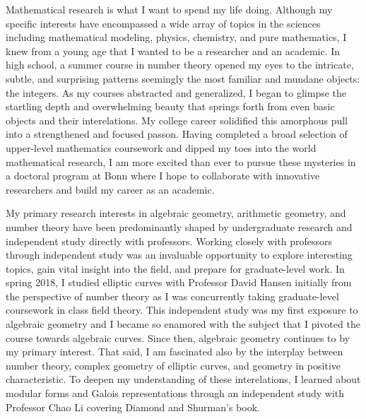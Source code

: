 \documentclass[11pt]{amsart}
\begin{document}
Mathematical research is what I want to spend my life doing. Although my specific interests have encompassed a wide array of topics in the sciences including mathematical modeling, physics, chemistry, and pure mathematics, I knew from a young age that I wanted to be a researcher and an academic. In high school, a summer course in number theory opened my eyes to the intricate, subtle, and surprising patterns seemingly the most familiar and mundane objects: the integers. As my courses abstracted and generalized, I began to glimpse the startling depth and overwhelming beauty that springs forth from even basic objects and their interelations. My college career solidified this amorphous pull into a strengthened and focused passon. Having completed a broad selection of upper-level mathematics coursework and dipped my toes into the world mathematical research, I am more excited than ever to pursue these mysteries in a doctoral program at Bonn where I hope to collaborate with innovative researchers and build my career as an academic.
\par
My primary research interests in algebraic geometry, arithmetic geometry, and number theory have been predominantly shaped by undergraduate research and independent study directly with professors. Working closely with professors through independent study was an invaluable opportunity to explore interesting topics, gain vital insight into the field, and prepare for graduate-level work. In spring 2018, I studied elliptic curves with Professor David Hansen initially from the perspective of number theory as I was concurrently taking graduate-level coursework in class field theory. This independent study was my first exposure to algebraic geometry and I became so enamored with the subject that I pivoted the course towards algebraic curves. Since then, algebraic geometry continues to by my primary interest. That said, I am fascinated also by the interplay between number theory, complex geometry of elliptic curves, and geometry in positive characteristic. To deepen my understanding of these interelations, I learned about modular forms and Galois representations through an independent study with Professor Chao Li covering Diamond and Shurman's book. 
\par
\end{document}
